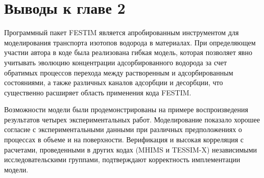 \section{Выводы к главе 2}

Программный пакет FESTIM является апробированным инструментом для моделирования транспорта изотопов водорода в материалах. При определяющем участии автора в коде была реализована гибкая модель, которая позволяет явно учитывать эволюцию концентрации адсорбированного водорода за счет обратимых процессов перехода между растворенным и адсорбированным состояниями, а также различных каналов адсорбции и десорбции, что существенно расширяет область применения кода FESTIM.

Возможности модели были продемонстрированы на примере воспроизведения результатов четырех экспериментальных работ. Моделирование показало хорошее согласие с экспериментальными данными при различных предположениях о процессах в объеме и на поверхности. Верификация и высокая корреляция с расчетами, проведенными в других кодах (MHIMS и TESSIM-X) независимыми исследовательскими группами, подтверждают корректность имплементации модели.


